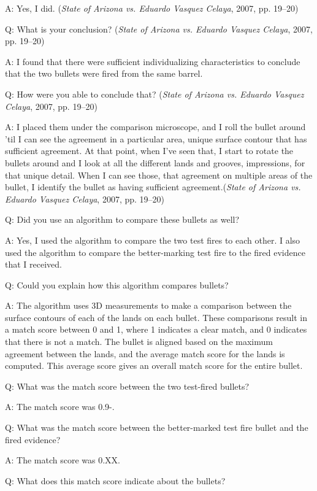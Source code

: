 \documentclass[print]{nuthesis}
\begin{document}
A: Yes, I did. (\emph{State of {Arizona} vs. Eduardo {Vasquez} {Celaya}}, 2007, pp. 19--20)

Q: What is your conclusion? (\emph{State of {Arizona} vs. Eduardo {Vasquez} {Celaya}}, 2007, pp. 19--20)

A: I found that there were sufficient individualizing characteristics to conclude that the two bullets were fired from the same barrel.

Q: How were you able to conclude that? (\emph{State of {Arizona} vs. Eduardo {Vasquez} {Celaya}}, 2007, pp. 19--20)

A: I placed them under the comparison microscope, and I roll the bullet around 'til I can see the agreement in a particular area, unique surface contour that has sufficient agreement.
At that point, when I've seen that, I start to rotate the bullets around and I look at all the different lands and grooves, impressions, for that unique detail.
When I can see those, that agreement on multiple areas of the bullet, I identify the bullet as having sufficient agreement.(\emph{State of {Arizona} vs. Eduardo {Vasquez} {Celaya}}, 2007, pp. 19--20)

Q: Did you use an algorithm to compare these bullets as well?

A: Yes, I used the algorithm to compare the two test fires to each other.
I also used the algorithm to compare the better-marking test fire to the fired evidence that I received.

Q: Could you explain how this algorithm compares bullets?

A: The algorithm uses 3D measurements to make a comparison between the surface contours of each of the lands on each bullet.
These comparisons result in a match score between 0 and 1, where 1 indicates a clear match, and 0 indicates that there is not a match.
The bullet is aligned based on the maximum agreement between the lands, and the average match score for the lands is computed.
This average score gives an overall match score for the entire bullet.

Q: What was the match score between the two test-fired bullets?

A: The match score was 0.9-.

Q: What was the match score between the better-marked test fire bullet and the fired evidence?

A: The match score was 0.XX.

Q: What does this match score indicate about the bullets?
\end{document}
